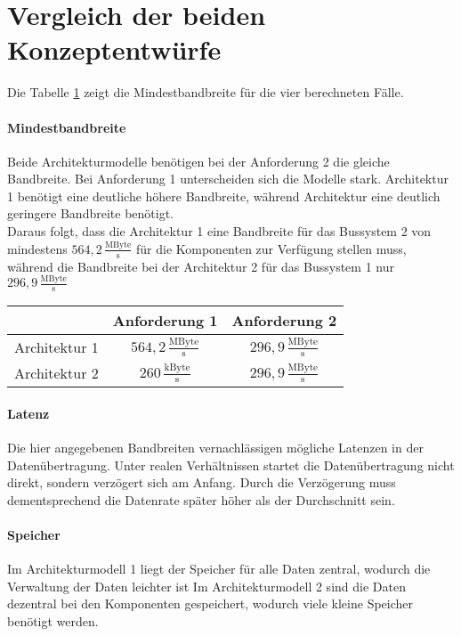 \section{Vergleich der beiden Konzeptentwürfe}
Die Tabelle \ref{tab:Mindestbandbreite} zeigt die Mindestbandbreite für die vier berechneten Fälle. 
\paragraph{Mindestbandbreite}
Beide Architekturmodelle benötigen bei der Anforderung 2 die gleiche Bandbreite. Bei Anforderung 1 unterscheiden sich die Modelle stark. Architektur 1 benötigt eine deutliche höhere Bandbreite, während Architektur eine deutlich geringere Bandbreite benötigt.\\
Daraus folgt, dass die Architektur 1 eine Bandbreite für das Bussystem 2 von mindestens $ 564,2\,\frac{\mathrm{MByte}}{\mathrm{s}} $ für die Komponenten zur Verfügung stellen muss, während die Bandbreite bei der Architektur 2 für das Bussystem 1 nur $ 296,9\,\frac{\mathrm{MByte}}{\mathrm{s}} $
\begin{table}[]	
	\centering
	\renewcommand{\arraystretch}{1.5}	%
	\label{tab:Mindestbandbreite}
	\begin{tabular}{c|c|c|}
		& \textbf{Anforderung 1} & \textbf{Anforderung 2} \\
		\hline
		Architektur 1 & $ 564,2\,\frac{\mathrm{MByte}}{\mathrm{s}} $ & $ 296,9\,\frac{\mathrm{MByte}}{\mathrm{s}} $ \\
		\hline
		Architektur 2 & $ 260\,\frac{\mathrm{kByte}}{\mathrm{s}} $ & $ 296,9\,\frac{\mathrm{MByte}}{\mathrm{s}} $ \\
		\hline
	\end{tabular} 
\end{table}
\paragraph{Latenz} 
Die hier angegebenen Bandbreiten vernachlässigen mögliche Latenzen in der Datenübertragung. Unter realen Verhältnissen startet die Datenübertragung nicht direkt, sondern verzögert sich am Anfang. Durch die Verzögerung muss dementsprechend die Datenrate später höher als der Durchschnitt sein.
\paragraph{Speicher}
Im Architekturmodell 1 liegt der Speicher für alle Daten zentral, wodurch die Verwaltung der Daten leichter ist Im Architekturmodell 2 sind die Daten dezentral bei den Komponenten gespeichert, wodurch viele kleine Speicher benötigt werden.

